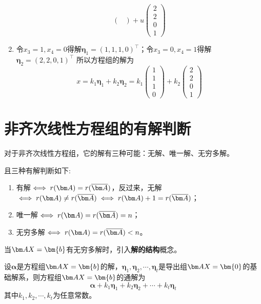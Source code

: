 \begin{solution}
\begin{enumerate}[itemindent=1em,label=\textbf{\textsf{方法}}\arabic*]
\[\begin{pmatrix}
                  \end{pmatrix}
                  + u
                  \begin{pmatrix}
                      2 \\2\\0\\1
                  \end{pmatrix}
              \]
        \item 令$x_3=1,x_4=0$得解$\bm{\eta}_1 = (1,1,1,0)^\intercal$；令$x_3=0,x_4=1$得解$\bm{\eta}_2=(2,2,0,1)^\intercal$
              所以方程组的解为
              \[
                  x= k_1\bm{\eta}_1+k_2\bm{\eta}_2 =
                  k_1
                  \begin{pmatrix}
                      1 \\1\\1\\0
                  \end{pmatrix}
                  +
                  k_2
                  \begin{pmatrix}
                      2 \\2\\0\\1
                  \end{pmatrix}
              \]
    \end{enumerate}
\end{solution}

\section{非齐次线性方程组的有解判断}
对于非齐次线性方程组，它的解有三种可能：无解、唯一解、无穷多解。
\begin{theorem}
    且三种有解判断如下:
    \begin{enumerate}[(1)]
        \item 有解$\iff r(\mat{A})=r(\overline{\mat{A}})$，反过来，无解$\iff r(\mat{A})\neq r(\overline{\mat{A}}) \iff r(\mat{A})+1 = r(\overline{\mat{A}})$；
        \item 唯一解$\iff r(\mat{A})=r(\overline{\mat{A}}) = n$；
        \item 无穷多解$\iff r(\mat{A})=r(\overline{\mat{A}})<n$。
    \end{enumerate}
\end{theorem}

当$\mat{AX}=\bm{b}$有无穷多解时，引入\textbf{\textsf{解的结构}}概念。
\begin{theorem}
    设$\bm{\alpha}$是方程组$\mat{AX}=\bm{b}$的解，$\bm{\eta}_1,\bm{\eta}_2,\cdots,\bm{\eta}_t$是导出组$\mat{AX}=\bm{0}$的基础解系，则方程组$\mat{AX}=\bm{b}$的通解为
    \[ \bm{\alpha} + k_1\bm{\eta}_1 + k_2\bm{\eta}_2 + \cdots + k_t\bm{\eta}_t \]
    其中$k_1,k_2,\cdots,k_t$为任意常数。
\end{theorem}

